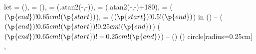 {{{            %
            let
             = (\tikztostart),
             = (\tikztotarget),
             = (\tikztostart.{atan2(-,-)}),
             = (\tikztotarget.{atan2(-,-)+180}),
             = ($(\p{end})!0.65cm!(\p{start})$),
             = ($(\p{start})!0.5!(\p{end})$)
            in
            () -- ($(\p{end})!0.65cm!(\p{start})!0.25cm!(\p{end})$)
            ($(\p{end})!0.65cm!(\p{start})!-0.25cm!(\p{end})$) --
            ()
            () circle[radius=0.25cm]
            \tikztonodes
        }
    },
}

